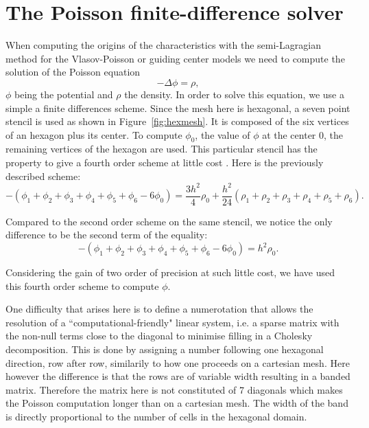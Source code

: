 \documentclass[proc]{edpsmath}
\begin{document}
\section{The Poisson finite-difference solver}
\label{sec:poisson_eqn}


When computing the origins of the characteristics with the semi-Lagragian method for the Vlasov-Poisson or guiding center models we need to compute the solution of the Poisson equation
\begin{equation*}
	- \Delta \phi = \rho ,
\end{equation*}
 $\phi$ being the potential and $\rho$ the density.
 In order to solve this equation, we use a simple a finite differences scheme. Since the mesh here is hexagonal, a seven point stencil is used as shown in Figure~\ref{fig:hexmesh}. It is composed of the six vertices of an hexagon plus its center. To compute  $\phi_0$, the value of $\phi$ at the center $0$,  the remaining vertices of the hexagon are used. 
 This particular stencil has the property to give a fourth order scheme at little cost \cite{poisson}. Here is the previously described scheme:
\begin{equation*}
-(\phi_1 + \phi_2 + \phi_3 + \phi_4 +\phi_5 + \phi_6 - 6 \phi_0)  = \frac{3h^2}{4} \rho_0 + \frac{h^2}{24}(\rho_1+\rho_2+\rho_3+\rho_4+\rho_5+\rho_6).
\end{equation*} 

Compared to the second order scheme on the same stencil, we notice the only difference to be the second term of the equality:  
\begin{equation*}
-(\phi_1 + \phi_2 + \phi_3 + \phi_4 +\phi_5 + \phi_6 - 6 \phi_0)  = h^2 \rho_0.
\end{equation*} 

Considering the gain of two order of precision at such little cost, we have used this fourth order scheme to compute $\phi$.

 \rmrk One difficulty that arises here is to define a numerotation that allows the resolution of a ``computational-friendly" linear system, i.e. a sparse matrix with the non-null terms close to the diagonal to minimise filling in a Cholesky decomposition. This is done by assigning a number following one hexagonal direction, row after row, similarily to how one proceeds on a cartesian mesh. Here however the difference is that the rows are of variable width resulting in a banded matrix. Therefore the matrix here is not constituted of 7 diagonals which makes the Poisson computation longer than on a cartesian mesh. The width of the band is directly proportional to the number of cells in the hexagonal domain.  
\end{document}
